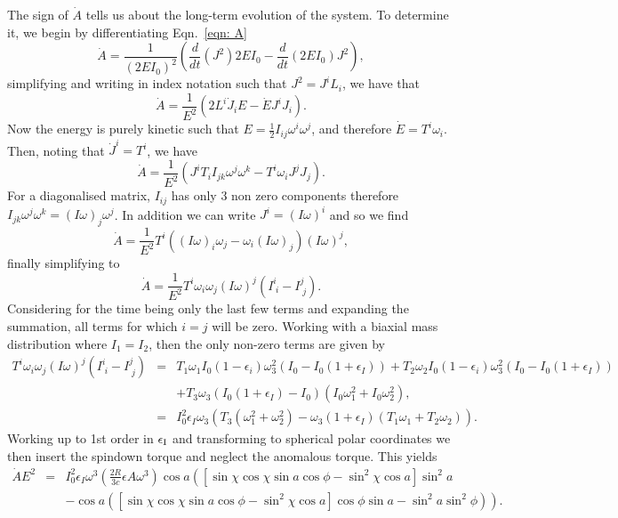 \documentclass[../full_thesis/full_thesis.tex]{subfiles}
\begin{document}
The sign of $\dot{A}$ tells us about the long-term evolution of the system. To
determine it, we begin by differentiating Eqn.~\eqref{eqn: A}
\begin{equation}
\dot{A}=\frac{1}{(2EI_{0})^{2}}
        \left(\frac{d}{dt}(J^{2})2EI_{0}-\frac{d}{dt}(2EI_{0})J^{2}\right),
\end{equation}
simplifying and writing in index notation such that $J^{2}=J^iL_i$, we have that
\begin{equation}
\dot{A}=\frac{1}{E^{2}}\left(2L^{i}\dot{J}_{i}E-\dot{E}J^{i}J_{i}\right).
\end{equation}
Now the energy is purely kinetic such that
$E=\frac{1}{2}I_{ij}\omega^{i}\omega^{j}$, and therefore $\dot{E}=T^{i}\omega_{i}$.
Then, noting that $\dot{J}^{i}=T^{i}$, we have
\begin{equation}
\dot{A}=\frac{1}{E^{2}}\left(J^{i}T_{i}I_{jk}\omega^{j}\omega^{k}
                             -T^{i}\omega_{i}J^{j}J_{j}\right).
\end{equation}
For a diagonalised matrix, $I_{ij}$ has only 3 non zero components therefore
$I_{jk}\omega^{j}\omega^{k}=(I\omega)_{j}\omega^{j}$. In addition we can write
$J^{i}=(I\omega)^{i}$ and so we find
\begin{equation}
\dot{A}=\frac{1}{E^{2}}T^{i}\left((I\omega)_{i}\omega_{j}
        -\omega_{i}(I\omega)_{j}\right)(I\omega)^{j},
\end{equation}
finally simplifying to
\begin{equation}
\dot{A}=\frac{1}{E^{2}}T^{i}\omega_{i}\omega_{j}
        (I\omega)^{j}\left(I^{i}_{\;i}-I^{j}_{\;j}\right).
\end{equation}
Considering for the time being only the last few terms and expanding the
summation, all terms for which $i=j$ will be zero. Working with a biaxial mass
distribution where $I_{1}=I_{2}$, then the only non-zero terms are given by 
\begin{eqnarray*}
T^{i}\omega_{i}\omega_{j}(I\omega)^{j}\left(I^{i}_{\;i}-I^{j}_{\;j}\right)&=&
T_{1}\omega_{1}I_{0}(1-\epsilon_{i})\omega^{2}_{3}
(I_{0}-I_{0}(1+\epsilon_{I}))+
T_{2}\omega_{2}I_{0}(1-\epsilon_{i})\omega^{2}_{3}(I_{0}-I_{0}(1+\epsilon_{I})) 
\\ && + 
T_{3}\omega_{3}(I_{0}(1+\epsilon_{I})-I_{0})
               (I_{0}\omega_{1}^{2}+I_{0}\omega_{2}^{2}), \\
&=& I_{0}^{2}\epsilon_{I}\omega_{3}\left(T_{3}(\omega_{1}^{2}+\omega_{2}^{2}) 
    - \omega_{3}(1+\epsilon_{I})(T_{1}\omega_{1}+T_{2}\omega_{2})\right).
\end{eqnarray*}
Working up to 1st order in $\epsilon_{\mathrm{I}}$ and transforming to spherical polar
coordinates we then insert the spindown torque and neglect the anomalous torque.
This yields
\begin{eqnarray*}
\dot{A}E^{2}&=& I_{0}^{2}\epsilon_{I}\omega^{3}
    \left(\frac{2R}{3c}\epsilon{A}\omega^{3}\right)
    \cos a \left([\sin \chi \cos \chi \sin a \cos \phi 
                 - \sin^{2}\chi \cos a]\sin^{2} a \right. \\
&& \left.- \cos a ([\sin \chi \cos \chi \sin a \cos \phi 
                   - \sin^{2}\chi \cos a]\cos \phi \sin a 
                   - \sin^{2}a \sin^{2}\phi)\right).
\end{eqnarray*}
\end{document}
